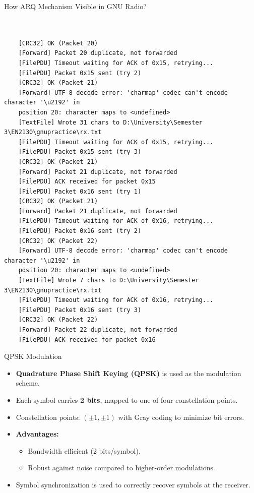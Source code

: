 \documentclass[11pt]{beamer}
\begin{document}
	\begin{frame}[fragile]{How ARQ Mechanism Visible in GNU Radio?}

		\tiny
		\begin{verbatim}
			

	[CRC32] OK (Packet 20)
	[Forward] Packet 20 duplicate, not forwarded
	[FilePDU] Timeout waiting for ACK of 0x15, retrying...
	[FilePDU] Packet 0x15 sent (try 2)
	[CRC32] OK (Packet 21)
	[Forward] UTF-8 decode error: 'charmap' codec can't encode character '\u2192' in
	position 20: character maps to <undefined>
	[TextFile] Wrote 31 chars to D:\University\Semester 3\EN2130\gnupractice\rx.txt
	[FilePDU] Timeout waiting for ACK of 0x15, retrying...
	[FilePDU] Packet 0x15 sent (try 3)
	[CRC32] OK (Packet 21)
	[Forward] Packet 21 duplicate, not forwarded
	[FilePDU] ACK received for packet 0x15
	[FilePDU] Packet 0x16 sent (try 1)
	[CRC32] OK (Packet 21)
	[Forward] Packet 21 duplicate, not forwarded
	[FilePDU] Timeout waiting for ACK of 0x16, retrying...
	[FilePDU] Packet 0x16 sent (try 2)
	[CRC32] OK (Packet 22)
	[Forward] UTF-8 decode error: 'charmap' codec can't encode character '\u2192' in
	position 20: character maps to <undefined>
	[TextFile] Wrote 7 chars to D:\University\Semester 3\EN2130\gnupractice\rx.txt
	[FilePDU] Timeout waiting for ACK of 0x16, retrying...
	[FilePDU] Packet 0x16 sent (try 3)
	[CRC32] OK (Packet 22)
	[Forward] Packet 22 duplicate, not forwarded
	[FilePDU] ACK received for packet 0x16
		\end{verbatim}
	
		
	\end{frame}
\begin{frame}{QPSK Modulation}
	\begin{itemize}
		\item \textbf{Quadrature Phase Shift Keying (QPSK)} is used as the modulation scheme.
		\item Each symbol carries \textbf{2 bits}, mapped to one of four constellation points.
		\item Constellation points: $(\pm 1, \pm 1)$ with Gray coding to minimize bit errors.
		\item \textbf{Advantages:}
		\begin{itemize}
			\item Bandwidth efficient (2 bits/symbol).
			\item Robust against noise compared to higher-order modulations.
		\end{itemize}
		\item Symbol synchronization is used to correctly recover symbols at the receiver.
	\end{itemize}
\end{frame}
\end{document}
